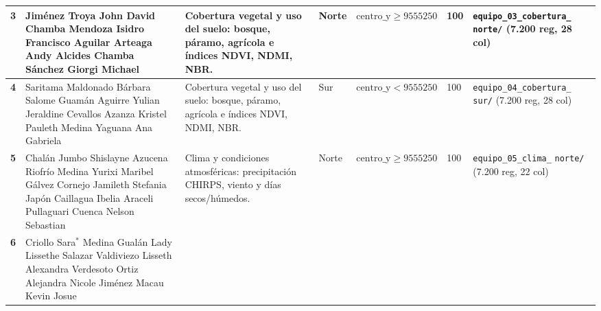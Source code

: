 \documentclass[11pt,a4paper]{article}
\begin{document}
\begin{table}[h!]
\begin{tabularx}{\textwidth}{C{0.8cm} L{3.5cm} L{3.3cm} C{1.1cm} C{1.8cm} C{1.1cm} Y}
\midrule
\textbf{3} & 
\textbullet{} Jiménez Troya John David\newline
\textbullet{} Chamba Mendoza Isidro Francisco\newline
\textbullet{} Aguilar Arteaga Andy Alcides\newline
\textbullet{} Chamba Sánchez Giorgi Michael & 
Cobertura vegetal y uso del suelo: bosque, páramo, agrícola e índices NDVI, NDMI, NBR. & 
Norte & 
$\text{centro\_y} \ge 9555250$ & 
100 & 
\texttt{equipo\_03\_cobertura\_} \newline \texttt{norte/} \newline (7.200 reg, 28 col) \\
\midrule
\textbf{4} & 
\textbullet{} Saritama Maldonado Bárbara Salome\newline
\textbullet{} Guamán Aguirre Yulian Jeraldine\newline
\textbullet{} Cevallos Azanza Kristel Pauleth\newline
\textbullet{} Medina Yaguana Ana Gabriela & 
Cobertura vegetal y uso del suelo: bosque, páramo, agrícola e índices NDVI, NDMI, NBR. & 
Sur & 
$\text{centro\_y} < 9555250$ & 
100 & 
\texttt{equipo\_04\_cobertura\_} \newline \texttt{sur/} \newline (7.200 reg, 28 col) \\
\midrule
\textbf{5} & 
\textbullet{} Chalán Jumbo Shislayne Azucena\newline
\textbullet{} Riofrío Medina Yurixi Maribel\newline
\textbullet{} Gálvez Cornejo Jamileth Stefania\newline
\textbullet{} Japón Caillagua Ibelia Araceli\newline
\textbullet{} Pullaguari Cuenca Nelson Sebastian & 
Clima y condiciones atmosféricas: precipitación CHIRPS, viento y días secos/húmedos. & 
Norte & 
$\text{centro\_y} \ge 9555250$ & 
100 & 
\texttt{equipo\_05\_clima\_} \newline \texttt{norte/} \newline (7.200 reg, 22 col) \\
\midrule
\textbf{6} & 
\textbullet{} Criollo Sara$^{*}$\newline
\textbullet{} Medina Gualán Lady Lissethe\newline
\textbullet{} Salazar Valdiviezo Lisseth Alexandra\newline
\textbullet{} Verdesoto Ortiz Alejandra Nicole\newline
\textbullet{} Jiménez Macau Kevin Josue & 

\end{tabularx}
\end{table}
\end{document}
